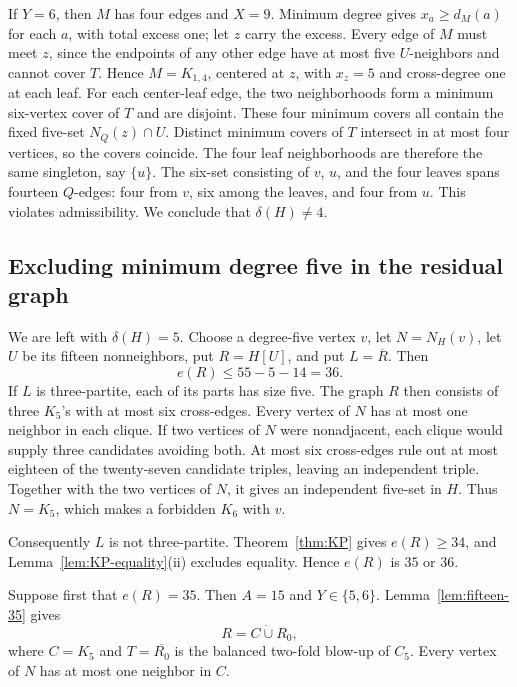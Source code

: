 \documentclass[11pt,reqno,a4paper]{amsart}
\theoremstyle{definition}
\theoremstyle{remark}
\newcommand{\comp}[1]{\overline{#1}}
\begin{document}
If $Y=6$, then $M$ has four edges and $X=9$.  Minimum degree gives
$x_a\geq d_M(a)$ for each $a$, with total excess one; let $z$ carry the
excess.  Every edge of $M$ must meet $z$, since the endpoints of any other
edge have at most five $U$-neighbors and cannot cover $T$.  Hence
$M=K_{1,4}$, centered at $z$, with $x_z=5$ and cross-degree one at each
leaf.  For each center-leaf edge, the two neighborhoods form a minimum
six-vertex cover of $T$ and are disjoint.  These four minimum covers all
contain the fixed five-set $N_Q(z)\cap U$.  Distinct minimum covers of $T$
intersect in at most four vertices, so the covers coincide.  The four leaf
neighborhoods are therefore the same singleton, say $\{u\}$.  The six-set
consisting of $v$, $u$, and the four leaves spans fourteen $Q$-edges: four
from $v$, six among the leaves, and four from $u$.  This violates
admissibility.  We conclude that $\delta(H)\ne4$.

\subsection*{Excluding minimum degree five in the residual graph}

We are left with $\delta(H)=5$.  Choose a degree-five vertex $v$, let
$N=N_H(v)$, let $U$ be its fifteen nonneighbors, put $R=H[U]$, and put
$L=\comp R$.  Then
\begin{equation}\label{eq:H-fifteen}
  e(R)\leq55-5-14=36.
\end{equation}
If $L$ is three-partite, each of its parts has size five.  The graph $R$
then consists of three $K_5$'s with at most six cross-edges.  Every vertex
of $N$ has at most one neighbor in each clique.  If two vertices of $N$
were nonadjacent, each clique would supply three candidates avoiding both.
At most six cross-edges rule out at most eighteen of the twenty-seven
candidate triples, leaving an independent triple.  Together with the two
vertices of $N$, it gives an independent five-set in $H$.  Thus $N=K_5$,
which makes a forbidden $K_6$ with $v$.

Consequently $L$ is not three-partite.  Theorem~\ref{thm:KP} gives
$e(R)\geq34$, and Lemma~\ref{lem:KP-equality}(ii) excludes equality.  Hence
$e(R)$ is $35$ or $36$.

Suppose first that $e(R)=35$.  Then $A=15$ and $Y\in\{5,6\}$.
Lemma~\ref{lem:fifteen-35} gives
\[
  R=C\mathbin{\dot\cup}R_0,
\]
where $C=K_5$ and $T=\comp{R_0}$ is the balanced two-fold blow-up of $C_5$.
Every vertex of $N$ has at most one neighbor in $C$.
\end{document}
